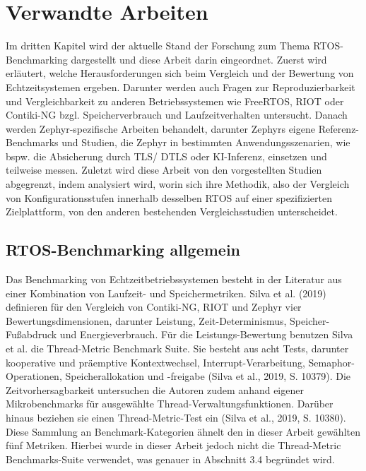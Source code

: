 \chapter{Verwandte Arbeiten}
Im dritten Kapitel wird der aktuelle Stand der Forschung zum Thema RTOS-Benchmarking dargestellt und diese Arbeit darin eingeordnet. Zuerst wird erläutert, welche Herausforderungen sich beim Vergleich und der Bewertung von Echtzeitsystemen ergeben. Darunter werden auch Fragen zur Reproduzierbarkeit und Vergleichbarkeit zu anderen Betriebssystemen wie FreeRTOS, RIOT oder Contiki-NG bzgl. Speicherverbrauch und Laufzeitverhalten untersucht. Danach werden Zephyr-spezifische Arbeiten behandelt, darunter Zephyrs eigene Referenz-Benchmarks und Studien, die Zephyr in bestimmten Anwendungsszenarien, wie bspw. die Absicherung durch TLS/ DTLS oder KI-Inferenz, einsetzen und teilweise messen. Zuletzt wird diese Arbeit von den vorgestellten Studien abgegrenzt, indem analysiert wird, worin sich ihre Methodik, also der Vergleich von Konfigurationsstufen innerhalb desselben RTOS auf einer spezifizierten Zielplattform, von den anderen bestehenden Vergleichsstudien unterscheidet.

\section{RTOS-Benchmarking allgemein}
Das Benchmarking von Echtzeitbetriebssystemen besteht in der Literatur aus einer Kombination von Laufzeit- und Speichermetriken. Silva et al. (2019) definieren für den Vergleich von Contiki-NG, RIOT und Zephyr vier Bewertungsdimensionen, darunter Leistung, Zeit-Determinismus, Speicher-Fußabdruck und Energieverbrauch. Für die Leistungs-Bewertung benutzen Silva et al. die Thread-Metric Benchmark Suite. Sie besteht aus acht Tests, darunter kooperative und präemptive Kontextwechsel, Interrupt-Verarbeitung, Semaphor-Operationen, Speicherallokation und -freigabe (Silva et al., 2019, S. 10379). Die Zeitvorhersagbarkeit untersuchen die Autoren zudem anhand eigener Mikrobenchmarks für ausgewählte Thread-Verwaltungsfunktionen. Darüber hinaus beziehen sie einen Thread-Metric-Test ein (Silva et al., 2019, S. 10380). Diese Sammlung an Benchmark-Kategorien ähnelt den in dieser Arbeit gewählten fünf Metriken. Hierbei wurde in dieser Arbeit jedoch nicht die Thread-Metric Benchmarks-Suite verwendet, was genauer in Abschnitt 3.4 begründet wird.

